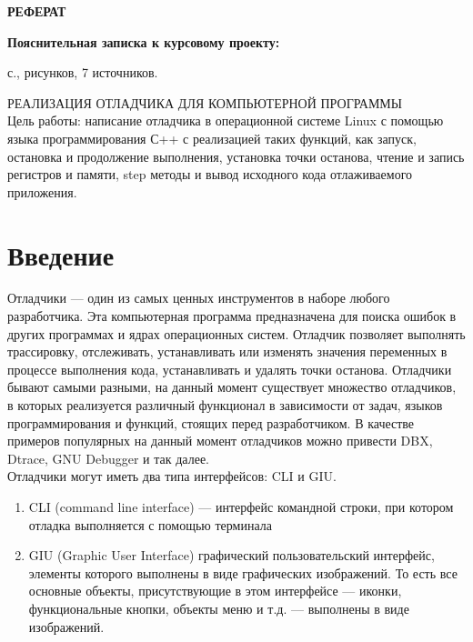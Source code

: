 \documentclass[oneside,final,14pt]{extreport}
\begin{document}
\clearpage
{\bf РЕФЕРАТ}

\vskip12pt
{\bf Пояснительная записка к курсовому проекту: } {
	 \begin{NoHyper}{\pageref{LastPage}}\end{NoHyper} с., 
	  рисунков, 
	 7 источников.
 }

РЕАЛИЗАЦИЯ ОТЛАДЧИКА ДЛЯ КОМПЬЮТЕРНОЙ ПРОГРАММЫ\\

Цель работы: написание отладчика в операционной системе Linux с помощью языка программирования С++ с реализацией таких функций, как запуск, остановка и продолжение выполнения, установка точки останова, чтение и запись регистров и памяти, step методы и вывод исходного кода отлаживаемого приложения.

\newpage
\tableofcontents
\chapter{Введение}
Отладчики — один из самых ценных инструментов в наборе любого разработчика. Эта компьютерная программа предназначена для поиска ошибок в других программах и ядрах операционных систем. Отладчик позволяет выполнять трассировку, отслеживать, устанавливать или изменять значения переменных в процессе выполнения кода, устанавливать и удалять точки останова.
Отладчики бывают самыми разными, на данный момент существует множество отладчиков, в которых реализуется различный функционал в зависимости от задач, языков программирования и функций, стоящих перед разработчиком. В качестве примеров популярных на данный момент отладчиков можно привести DBX, Dtrace, GNU Debugger и так далее.\\

Отладчики могут иметь два типа интерфейсов: CLI и GIU.
\begin{enumerate}
	\item CLI (command line interface) — интерфейс командной строки, при котором отладка выполняется с помощью терминала
	\item GIU (Graphic User Interface) графический пользовательский интерфейс, элементы которого выполнены в виде графических изображений. То есть все основные объекты, присутствующие в этом интерфейсе — иконки, функциональные кнопки, объекты меню и т.д. — выполнены в виде изображений.
\end{enumerate}
\end{document}
